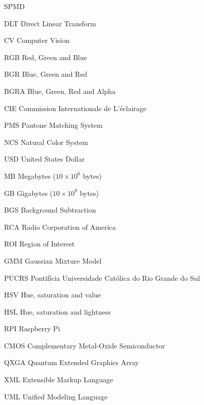 \documentclass[ecp,tc]{iiufrgs}
\begin{document}
\begin{listofabbrv}{SPMD}
        \item[DLT] Direct Linear Transform
        \item[CV] Computer Vision
        \item[RGB] Red, Green and Blue
        \item[BGR] Blue, Green and Red
        \item[BGRA] Blue, Green, Red and Alpha
        \item[CIE] Commission Internationale de L'éclairage
        \item[PMS] Pantone Matching System
        \item[NCS] Natural Color System
        \item[USD] United States Dollar
        \item[MB] Megabytes ($ 10\times10^6 $ bytes)
        \item[GB] Gigabytes ($ 10\times10^9 $ bytes)
        \item[BGS] Background Subtraction
        \item[RCA] Radio Corporation of America
        \item[ROI] Region of Interest
        \item[GMM] Gaussian Mixture Model
        \item[PUCRS] Pontifícia Universidade Católica do Rio Grande do Sul
        \item[HSV] Hue, saturation and value
        \item[HSL] Hue, saturation and lightness
        \item[RPI] Raspberry Pi
        \item[CMOS] Complementary Metal-Oxide Semiconductor
        \item[QXGA] Quantum Extended Graphics Array
        \item[XML] Extensible Markup Language
        \item[UML] Unified Modeling Language
    \end{listofabbrv}

\end{document}
